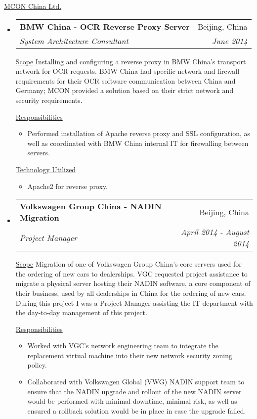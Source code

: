 \documentclass[a4paper,11pt]{article}
\makeatletter
\newlength{\outerbordwidth}
\newcommand{\resitem}[1]{\item #1 \vspace{-2pt}}
\newcommand{\resheading}[1]{\vspace{8pt}
  \parbox{\textwidth}{\setlength{\FrameSep}{\outerbordwidth}
    \begin{shaded}
\setlength{\fboxsep}{0pt}\framebox[\textwidth][l]{\setlength{\fboxsep}{4pt}\fcolorbox{shadecolorB}{shadecolorB}{\textbf{\sffamily{\mbox{~}\makebox[6.762in][l]{\large #1} \vphantom{p\^{E}}}}}}
    \end{shaded}
  }\vspace{-5pt}
}
\newcommand{\ressubheading}[4]{
\begin{tabular*}{6.5in}{l@{\cftdotfill{\cftsecdotsep}\extracolsep{\fill}}r}
		\textbf{#1} & #2 \\
		\textit{#3} & \textit{#4} \\
\end{tabular*}\vspace{-6pt}}
\makeatother
\begin{document}
\resheading{Projects}

\underline{MCON China Ltd.}
\linebreak

\begin{itemize}

	\item
		\ressubheading{BMW China - OCR Reverse Proxy Server}{Beijing, China}{System Architecture Consultant}{June 2014}
		\linebreak
		\linebreak

		\underline{Scope}
		\linebreak
		\linebreak
		Installing and configuring a reverse proxy in BMW China's transport network for OCR requests. BMW China had specific network and firewall requirements for their OCR software communication between China and Germany; MCON provided a solution based on their strict network and security requirements.

		\underline{Responsibilities}
		\begin{itemize}
			\resitem{Performed installation of Apache reverse proxy and SSL configuration, as well as coordinated with BMW China internal IT for firewalling between servers.}
		\end{itemize}

		\underline{Technology Utilized}
		\begin{itemize}
			\resitem{Apache2 for reverse proxy.}
		\end{itemize}

	\item
		\ressubheading{Volkswagen Group China - NADIN Migration}{Beijing, China}{Project Manager}{April 2014 - August 2014}
		\linebreak
		\linebreak

		\underline{Scope}
		\linebreak
		\linebreak
		Migration of one of Volkswagen Group China's core servers used for the ordering of new cars to dealerships. VGC requested project assistance to migrate a physical server hosting their NADIN software, a core component of their business, used by all dealerships in China for the ordering of new cars. During this project I was a Project Manager assisting the IT department with the day-to-day management of this project.

		\underline{Responsibilities}
		\begin{itemize}
			\resitem{Worked with VGC's network engineering team to integrate the replacement virtual machine into their new network security zoning policy.}
			\resitem{Collaborated with Volkswagen Global (VWG) NADIN support team to ensure that the NADIN upgrade and rollout of the new NADIN server would be performed with minimal downtime, minimal risk, as well as ensured a rollback solution would be in place in case the upgrade failed.}
		\end{itemize}


\end{itemize}
\end{document}
